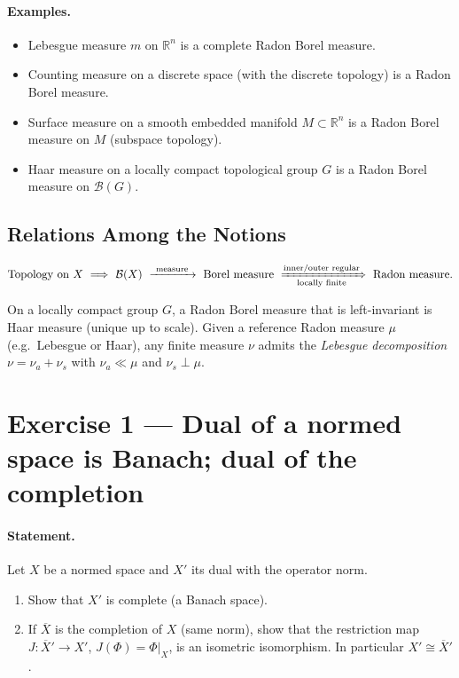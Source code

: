 \documentclass[12pt,a4paper]{article}
\theoremstyle{plain}
\theoremstyle{definition}
\theoremstyle{remark}
\theoremstyle{remark}
\theoremstyle{definition}
\begin{document}
	\paragraph{Examples.}
	\begin{itemize}
		\item Lebesgue measure $m$ on $\mathbb{R}^n$ is a complete Radon Borel measure.
		\item Counting measure on a discrete space (with the discrete topology) is a Radon Borel measure.
		\item Surface measure on a smooth embedded manifold $M\subset\mathbb{R}^n$ is a Radon Borel measure on $M$ (subspace topology).
		\item Haar measure on a locally compact topological group $G$ is a Radon Borel measure on $\mathcal{B}(G)$.
	\end{itemize}
	
	\bigskip\bigskip
	
	\subsection*{Relations Among the Notions}
	
	\[
	\text{Topology on } X
	\ \Longrightarrow\ 
	\mathcal{B}(X)
	\ \xrightarrow{\ \text{measure}\ }\ 
	\text{Borel measure}
	\ \xRightarrow[\text{locally finite}]{\text{inner/outer regular}}
	\ \text{Radon measure}.
	\]
	
	On a locally compact group $G$, a Radon Borel measure that is left-invariant
	is Haar measure (unique up to scale). Given a reference Radon measure $\mu$
	(e.g.\ Lebesgue or Haar), any finite measure $\nu$ admits the \emph{Lebesgue decomposition}
	$\nu=\nu_a+\nu_s$ with $\nu_a\ll\mu$ and $\nu_s\perp\mu$.
	
	
	\section*{Exercise 1 — Dual of a normed space is Banach; dual of the completion}
	
	\paragraph{Statement.}
	Let $X$ be a normed space and $X'$ its dual with the operator norm.
	\begin{enumerate}
		\item[(a)] Show that $X'$ is complete (a Banach space).
		\item[(b)] If $\overline{X}$ is the completion of $X$ (same norm), show that the restriction map
		$J:\overline{X}'\to X'$, $J(\Phi)=\Phi|_X$, is an isometric isomorphism. In particular $X'\cong \overline{X}'$.
	\end{enumerate}
	
\end{document}
